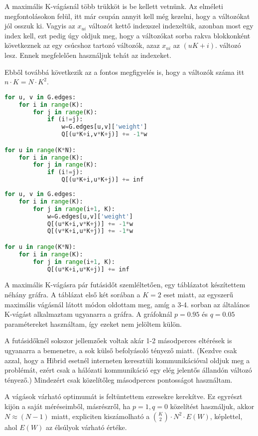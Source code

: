 A maximális K-vágásnál több trükköt is be kellett vetnünk. Az elméleti megfontolásokon felül, itt már csupán annyit kell még kezelni, hogy a változókat jól osszuk ki. Vagyis az $x_{ui}$ változót kettő indexszel indexeltük, azonban most egy index kell, ezt pedig úgy oldjuk meg, hogy a változókat sorba rakva blokkonként következnek az egy csúcshoz tartozó változók, azaz $x_{ui}$ az $(uK+i)$. változó lesz. Ennek megfelelően használjuk tehát az indexeket.

Ebből továbbá következik az a fontos megfigyelés is, hogy a változók száma itt $n \cdot K = N \cdot K^2$.

\begin{lstlisting}[language=python,caption=Max-K-cut QUBO, label=code:maxKCutQUBO]
for u, v in G.edges:
	for i in range(K):
		for j in range(K):
			if (i!=j):
				w=G.edges[u,v]['weight']
				Q[(u*K+i,v*K+j)] += -1*w

for u in range(K*N):
	for i in range(K):
		for j in range(K):
			if (i!=j):
				Q[(u*K+i,u*K+j)] += inf 
\end{lstlisting}

\begin{lstlisting}[language=python,caption=Max-K-cut QUBO (alternatív),label=code:maxKCutQUBOAlt]
for u, v in G.edges:
	for i in range(K):
		for j in range(i+1, K):
			w=G.edges[u,v]['weight']
			Q[(u*K+i,v*K+j)] += -1*w
			Q[(v*K+i,u*K+j)] += -1*w

for u in range(K*N):
	for i in range(K):
		for j in range(i+1, K):
			Q[(u*K+i,u*K+j)] += inf
\end{lstlisting}

A maximális K-vágásra pár futásidőt szemléltetően, egy táblázatot készítettem néhány gráfra. A táblázat első két sorában a $K=2$ eset miatt, az egyszerű maximális vágásnál látott módon oldottam meg, amíg a 3-4. sorban az általános K-vágást alkalmaztam ugyanarra a gráfra. A gráfoknál $p=0.95$ és $q=0.05$ paramétereket használtam, így ezeket nem jelöltem külön.

A futásidőknél sokszor jellemzőek voltak akár 1-2 másodperces eltérések is ugyanarra a bemenetre, a sok külső befolyásoló tényező miatt. (Kezdve csak azzal, hogy a Hibrid esetnél interneten keresztüli kommunikációval oldjuk meg a problémát, ezért csak a hálózati kommunikáció egy elég jelentős állandón változó tényező.) Mindezért csak közelítőleg másodperces pontosságot használtam.

A vágások várható optimumát is feltüntettem  ezresekre kerekítve. Ez egyrészt kijön a saját méréseimből, másrészről, ha $p=1, q=0$ közelítést használjuk, akkor $N \approx (N-1)$ miatt, expliciten kiszámolható a $\binom{K}{2} \cdot N^2 \cdot E(W)$, képlettel, ahol $E(W)$ az élsúlyok várható értéke.

